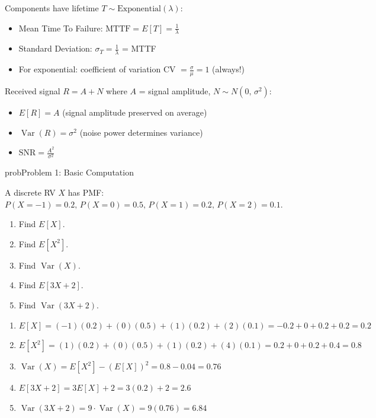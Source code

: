 
Components have lifetime $T \sim \mathrm{Exponential}(\lambda)$:

\begin{itemize}
\tightlist
\item
  Mean Time To Failure: $\mathrm{MTTF} = E[T] = \frac{1}{\lambda}$
\item
  Standard Deviation: $\sigma_{T} = \frac{1}{\lambda}$ = MTTF
\item
  For exponential: coefficient of variation CV $= \frac{\sigma}{\mu} = 1$ (always!)
\end{itemize}


Received signal $R = A + N$ where $A$ = signal amplitude, $N \sim N(0,\, \sigma^{2})$:

\begin{itemize}
\tightlist
\item
  $E[R] = A$ (signal amplitude preserved on average)
\item
  $\operatorname{Var}(R) = \sigma^{2}$ (noise power determines variance)
\item
  $\displaystyle \mathrm{SNR} = \frac{A^{2}}{\sigma^{2}}$
\end{itemize}


\begin{PSbox}[unbreakable]{prob}{Problem 1: Basic Computation}

A discrete RV $X$ has PMF: $P(X = -1) = 0.2,\, P(X = 0) = 0.5,\, P(X = 1) = 0.2,\, P(X = 2) = 0.1$.

\begin{enumerate}
\def\labelenumi{(\alph{enumi})}
\tightlist
\item
  Find $E[X]$.
\item
  Find $E[X^{2}]$.
\item
  Find $\operatorname{Var}(X)$.
\item
  Find $E[3X + 2]$.
\item
  Find $\operatorname{Var}(3X + 2)$.
\end{enumerate}

\PSsolution{} 

\begin{enumerate}
\def\labelenumi{(\alph{enumi})}
\item
  $E[X] = (-1)(0.2) + (0)(0.5) + (1)(0.2) + (2)(0.1) = -0.2 + 0 + 0.2 + 0.2 = 0.2$
\item
  $E[X^{2}] = (1)(0.2) + (0)(0.5) + (1)(0.2) + (4)(0.1) = 0.2 + 0 + 0.2 + 0.4 = 0.8$
\item
  $\operatorname{Var}(X) = E[X^{2}] - (E[X])^{2} = 0.8 - 0.04 = 0.76$
\item
  $E[3X + 2] = 3E[X] + 2 = 3(0.2) + 2 = 2.6$
\item
  $\operatorname{Var}(3X + 2) = 9 \cdot \operatorname{Var}(X) = 9(0.76) = 6.84$
\end{enumerate}

\end{PSbox}

